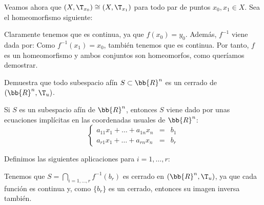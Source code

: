 \begin{ejercicio}
    Veamos ahora que $(X, \T_{x_0}) \cong (X, \T_{x_1})$ para todo par de puntos $x_0, x_1 \in X$. Sea el homeomorfismo siguiente:

    Claramente tenemos que es continua, ya que $f(x_0)=y_0$. Además, $f^{-1}$ viene dada por:
    Como $f^{-1}(x_1)=x_0$, también tenemos que es continua.
    Por tanto, $f$ es un homeomorfismo y ambos conjuntos son homeomorfos, como queríamos demostrar.
\end{ejercicio}

\begin{ejercicio}
    Demuestra que todo subespacio afín $S \subset \bb{R}^n$ es un cerrado de $(\bb{R}^n, \T_u)$.
    
    Si $S$ es un subespacio afín de $\bb{R}^n$, entonces $S$ viene dado por unas ecuaciones implícitas en las coordenadas usuales de $\bb{R}^n$:
    \begin{equation*}
        \left\{
            \begin{array}{ccc}
                 a_{11}x_1 + \dots + a_{1n}x_n &=& b_1 \\
                 a_{r1}x_1 + \dots + a_{rn}x_n &=& b_r
            \end{array}
        \right.
    \end{equation*}

    Definimos las siguientes aplicaciones para $i=1,\dots,r$:

    Tenemos que $S=\bigcap\limits_{i=1,\dots,r}f^{-1}(b_r)$ es cerrado en $(\bb{R}^n,\T_u)$, ya que cada función es continua y, como $\{b_r\}$ es un cerrado, entonces su imagen inversa también.
\end{ejercicio}

